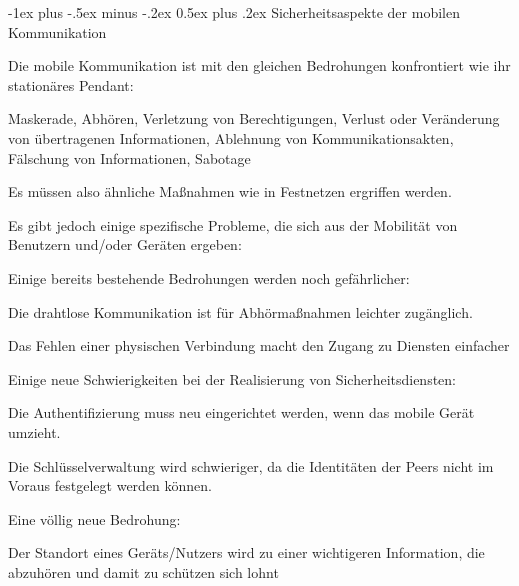 \documentclass[a4paper]{article}
\makeatletter
\renewcommand{\section}{\@startsection{section}{1}{0mm}%
 {-1ex plus -.5ex minus -.2ex}%
 {0.5ex plus .2ex}%
 {\normalfont\large\bfseries}}
\makeatother
\begin{document}
\begin{multicols}{3}
\begin{itemize*}
            \section{Sicherheitsaspekte der mobilen
              Kommunikation}
            \begin{itemize*}
                  \item       Die mobile Kommunikation ist mit den gleichen Bedrohungen konfrontiert
                  wie ihr stationäres Pendant:
                  \begin{itemize*}
                        \item Maskerade, Abhören, Verletzung von Berechtigungen, Verlust oder Veränderung von übertragenen Informationen, Ablehnung von Kommunikationsakten, Fälschung von Informationen, Sabotage
                        \item Es müssen also ähnliche Maßnahmen wie in Festnetzen ergriffen werden.
                  \end{itemize*}
                  \item       Es gibt jedoch einige spezifische Probleme, die sich aus der Mobilität
                  von Benutzern und/oder Geräten ergeben:
                  \begin{itemize*}
                        \item Einige bereits bestehende Bedrohungen werden noch gefährlicher:
                        \begin{itemize*} \item Die drahtlose Kommunikation ist für Abhörmaßnahmen leichter zugänglich. \item Das Fehlen einer physischen Verbindung macht den Zugang zu Diensten einfacher \end{itemize*}
                        \item Einige neue Schwierigkeiten bei der Realisierung von Sicherheitsdiensten:
                        \begin{itemize*} \item Die Authentifizierung muss neu eingerichtet werden, wenn das mobile Gerät umzieht. \item Die Schlüsselverwaltung wird schwieriger, da die Identitäten der Peers nicht im Voraus festgelegt werden können. \end{itemize*}
                        \item Eine völlig neue Bedrohung:
                        \begin{itemize*} \item Der Standort eines Geräts/Nutzers wird zu einer wichtigeren Information, die abzuhören und damit zu schützen sich lohnt \end{itemize*}
                  \end{itemize*}
            \end{itemize*}


\end{itemize*}
\end{multicols}
\end{document}
